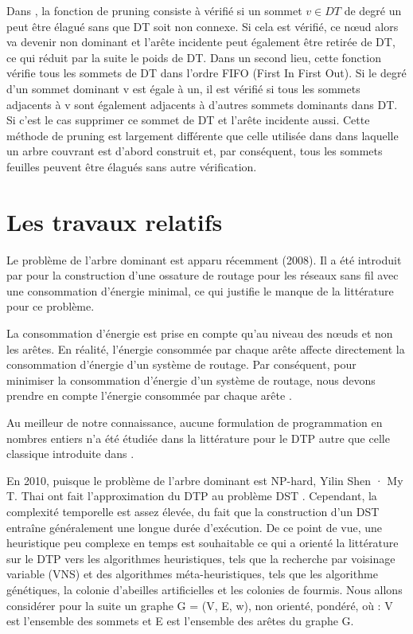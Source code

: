 Dans \cite{sundar2013new}, la fonction de pruning consiste à vérifié si un sommet $v \in DT$  de degré un peut être élagué  sans  que DT soit non connexe. Si cela est vérifié, ce nœud alors va devenir non dominant et l’arête incidente peut également être retirée de DT, ce qui réduit par la suite le poids de DT. Dans un second lieu, cette fonction vérifie  tous les sommets de DT dans l’ordre FIFO (First In First Out). Si le degré d’un sommet dominant v est égale à un, il est vérifié si tous les sommets adjacents à v sont également adjacents à d’autres sommets dominants dans DT. Si c’est le cas supprimer ce sommet de DT et l’arête incidente aussi. Cette méthode de pruning est largement différente que celle utilisée dans \cite{shin2010approximation} dans laquelle un arbre couvrant est d'abord construit et, par conséquent, tous les sommets feuilles peuvent être élagués sans autre vérification. 


\section{Les travaux relatifs}
Le problème de l’arbre dominant est apparu récemment (2008). Il a été introduit par \cite{zhang2008new} pour la construction d’une ossature de routage pour les réseaux sans fil avec une consommation d’énergie minimal, ce qui justifie le manque de la littérature pour ce problème. 

La consommation d’énergie est prise en compte qu’au niveau des nœuds et non les arêtes. En réalité, l'énergie consommée par chaque arête affecte directement la consommation d'énergie d'un système de routage. Par conséquent, pour minimiser la consommation d'énergie d'un système de routage, nous devons prendre en compte l'énergie consommée par chaque arête \cite{sundar2013new}.

Au meilleur de notre connaissance, aucune formulation de programmation en nombres entiers n'a été étudiée dans la littérature pour le DTP autre que celle classique introduite dans \cite{shin2010approximation}. 

En  2010, puisque le problème de l’arbre dominant est NP-hard, Yilin Shen · My T. Thai ont fait l'approximation du DTP au problème DST \cite{shin2010approximation}. Cependant, la complexité temporelle est assez élevée, du fait que la construction d'un DST entraîne généralement une longue durée d'exécution. De ce point de vue, une heuristique peu complexe en temps est souhaitable ce qui a orienté la littérature sur le DTP vers les algorithmes heuristiques, tels que la recherche par voisinage variable (VNS) et des algorithmes méta-heuristiques, tels que les algorithme génétiques, la colonie d'abeilles artificielles et les colonies de fourmis. 
Nous allons considérer pour la suite un graphe G = (V, E, w), non orienté, pondéré, où : V est l’ensemble des sommets et E est l’ensemble des arêtes du graphe G.

